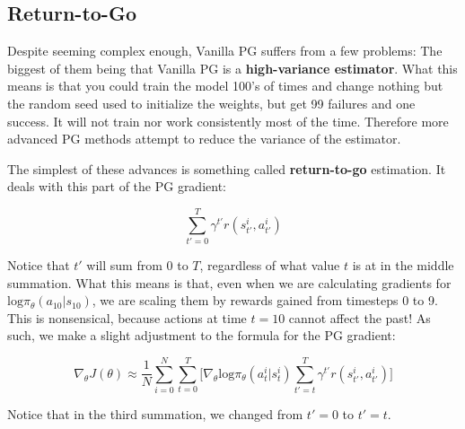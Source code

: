 \subsection{Return-to-Go}
\begin{flushleft}
    \large Despite seeming complex enough, Vanilla PG suffers from a few problems: The biggest of them being that Vanilla PG is a \textbf{high-variance estimator}. What this means is that you could train the model 100's of times and change nothing but the random seed used to initialize the weights, but get 99 failures and one success. It will not train nor work consistently most of the time. Therefore more advanced PG methods attempt to reduce the variance of the estimator. \break

    The simplest of these advances is something called \textbf{return-to-go} estimation. It deals with this part of the PG gradient:

    $$\sum_{t'=0}^T \gamma^{t'} r(s_{t'}^i, a_{t'}^i)$$

    Notice that $t'$ will sum from 0 to $T$, regardless of what value $t$ is at in the middle summation. What this means is that, even when we are calculating gradients for $\mathrm{log}\pi_\theta(a_10|s_10)$, we are scaling them by rewards gained from timesteps 0 to 9. This is nonsensical, because actions at time $t=10$ cannot affect the past! As such, we make a slight adjustment to the formula for the PG gradient:

    $$\nabla_\theta J(\theta) \approx \frac{1}{N}\sum_{i=0}^N\sum_{t=0}^T\biggl[ \nabla_\theta \mathrm{log}\pi_\theta(a_t^i|s_t^i)\sum_{t'=t}^T \gamma^{t'} r(s_{t'}^i, a_{t'}^i)\biggr]$$

    Notice that in the third summation, we changed from $t'=0$ to $t'=t$.
\end{flushleft}
